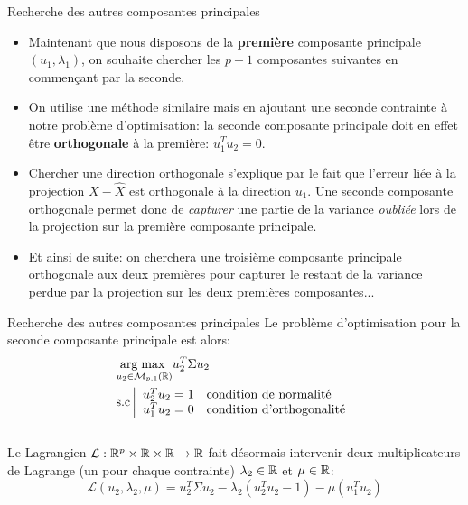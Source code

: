 \begin{frame}{Recherche des autres composantes principales}
	\begin{itemize}
		\item Maintenant que nous disposons de la \textbf{première} composante principale $(u_1, \lambda_1)$, on souhaite chercher les $p-1$ composantes suivantes en commençant par la seconde.
		\pause
		\item On utilise une méthode similaire mais en ajoutant une seconde contrainte à notre problème d'optimisation: la seconde composante principale doit en effet être \textbf{orthogonale} à la première: $u_1^T u_2 = 0$.
		\pause
		\item Chercher une direction orthogonale s'explique par le fait que l'erreur liée à la projection $X - \hat{X}$ est orthogonale à la direction $u_1$. Une seconde composante orthogonale permet donc de \textit{capturer} une partie de la variance \textit{oubliée} lors de la projection sur la première composante principale.
		\pause
		\item Et ainsi de suite: on cherchera une troisième composante principale orthogonale aux deux premières pour capturer le restant de la variance perdue par la projection sur les deux premières composantes...
	\end{itemize}
\end{frame}

\begin{frame}{Recherche des autres composantes principales}
	Le problème d'optimisation pour la seconde composante principale est alors:
	\begin{equation}
		\begin{aligned}
			&\underset{u_2 \in \mathcal{M}_{p,1}(\mathbb{R})}{\operatorname{arg\;max}\;} u_2^T \Sigma u_2 \\
			&\text{s.c} 
			\left|
				\begin{array}{ll}
					u_2^T u_2 = 1 & \text{condition de normalité} \\
					u_1^T u_2 = 0 & \text{condition d'orthogonalité}
				\end{array}
			\right.
		\end{aligned}
		\nonumber
	\end{equation}\\
	\vspace{0.5cm}
	\pause
	Le Lagrangien $\mathcal{L}: \mathbb{R}^p \times \mathbb{R} \times \mathbb{R} \to \mathbb{R}$ fait désormais intervenir deux multiplicateurs de Lagrange (un pour chaque contrainte) $\lambda_2 \in \mathbb{R}$ et $\mu \in \mathbb{R}$:
	\begin{equation}
		\mathcal{L}(u_2, \lambda_2, \mu) = u_2^T \Sigma u_2 - \lambda_2 \left(u_2^T u_2 - 1\right) - \mu \left(u_1^T u_2\right)
		\nonumber
	\end{equation}
\end{frame}

